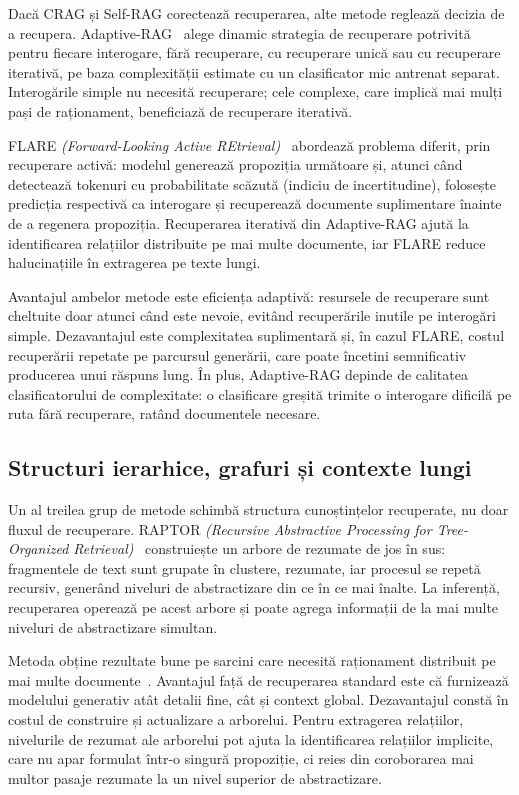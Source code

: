 Dacă CRAG și Self-RAG corectează recuperarea, alte metode reglează decizia de a recupera. Adaptive-RAG~\cite{jeong2024adaptiverag} alege dinamic strategia de recuperare potrivită pentru fiecare interogare, fără recuperare, cu recuperare unică sau cu recuperare iterativă, pe baza complexității estimate cu un clasificator mic antrenat separat. Interogările simple nu necesită recuperare; cele complexe, care implică mai mulți pași de raționament, beneficiază de recuperare iterativă.

FLARE \textit{(Forward-Looking Active REtrieval)}~\cite{jiang2023flare} abordează problema diferit, prin recuperare activă: modelul generează propoziția următoare și, atunci când detectează tokenuri cu probabilitate scăzută (indiciu de incertitudine), folosește predicția respectivă ca interogare și recuperează documente suplimentare înainte de a regenera propoziția. Recuperarea iterativă din Adaptive-RAG ajută la identificarea relațiilor distribuite pe mai multe documente, iar FLARE reduce halucinațiile în extragerea pe texte lungi.

Avantajul ambelor metode este eficiența adaptivă: resursele de recuperare sunt cheltuite doar atunci când este nevoie, evitând recuperările inutile pe interogări simple. Dezavantajul este complexitatea suplimentară și, în cazul FLARE, costul recuperării repetate pe parcursul generării, care poate încetini semnificativ producerea unui răspuns lung. În plus, Adaptive-RAG depinde de calitatea clasificatorului de complexitate: o clasificare greșită trimite o interogare dificilă pe ruta fără recuperare, ratând documentele necesare.

\subsection{Structuri ierarhice, grafuri și contexte lungi}

Un al treilea grup de metode schimbă structura cunoștințelor recuperate, nu doar fluxul de recuperare. RAPTOR \textit{(Recursive Abstractive Processing for Tree-Organized Retrieval)}~\cite{sarthi2024raptor} construiește un arbore de rezumate de jos în sus: fragmentele de text sunt grupate în clustere, rezumate, iar procesul se repetă recursiv, generând niveluri de abstractizare din ce în ce mai înalte. La inferență, recuperarea operează pe acest arbore și poate agrega informații de la mai multe niveluri de abstractizare simultan.

Metoda obține rezultate bune pe sarcini care necesită raționament distribuit pe mai multe documente~\cite{sarthi2024raptor}. Avantajul față de recuperarea standard este că furnizează modelului generativ atât detalii fine, cât și context global. Dezavantajul constă în costul de construire și actualizare a arborelui. Pentru extragerea relațiilor, nivelurile de rezumat ale arborelui pot ajuta la identificarea relațiilor implicite, care nu apar formulat într-o singură propoziție, ci reies din coroborarea mai multor pasaje rezumate la un nivel superior de abstractizare.

